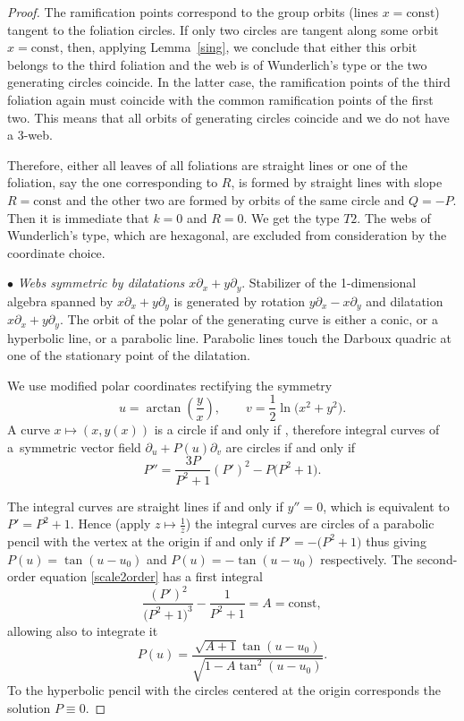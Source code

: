 \documentclass[pdftex]{sigma}
\numberwithin{equation}{section}
\begin{document}
\begin{proof}
The ramification points correspond to the group orbits (lines $x=\text{const}$) tangent to the foliation circles. If only two circles are tangent along some orbit $x=\text{const}$, then, applying Lemma~\ref{sing}, we conclude that either this orbit belongs to the third foliation and the web is of Wunderlich's type or the two generating circles coincide. In the latter case, the ramification points of the third foliation again must coincide with the common ramification points of the first two. This means that all orbits of generating circles coincide and we do not have a 3-web.

Therefore, either all leaves of all foliations are straight lines or one of the foliation, say the one corresponding to $R$, is formed by straight lines with slope $R=\text{const}$ and the other two are formed by orbits of the same circle and $Q=-P$. Then it is immediate that $k=0$ and $R=0$. We get the type $T2$. The webs of Wunderlich's type, which are hexagonal, are excluded from consideration by the coordinate choice.

$\bullet$ {\it Webs symmetric by dilatations $x\partial_x+y\partial_y$}.
Stabilizer of the 1-dimensional algebra spanned by $x\partial_x+y\partial_y$ is generated by rotation $y\partial_x-x\partial_y$ and dilatation $x\partial_x+y\partial_y$. The orbit of the polar of the generating curve is either a conic, or a hyperbolic line, or a parabolic line. Parabolic lines touch the Darboux quadric at one of the stationary point of the dilatation.

We use modified polar coordinates rectifying the symmetry
\begin{equation}\label{polar}
u = \arctan\left(\frac{y}{x}\right), \qquad v= \frac{1}{2} \ln\bigl(x^2 + y^2\bigr).
\end{equation}
A curve $x\mapsto (x,y(x))$ is a circle if and only if
,
therefore integral curves of a~symmetric vector field $\partial_u+P(u)\partial_v$ are circles
if and only if
\begin{equation}\label{scale2order}
P''=\frac{3P}{P^2 + 1}(P')^2 - P\bigl(P^2 + 1\bigr).
\end{equation}

The integral curves are straight lines if and only if $y''=0$, which is equivalent to
$P'=P^2+1$. Hence \big(apply $z\mapsto \frac{1}{z}$\big) the integral curves are circles of a parabolic pencil with the vertex at the origin if and only if $P'=-\big(P^2+1\big)$ thus giving $P(u)=\tan(u-u_0)$ and $P(u)=-\tan(u-u_0)$ respectively.
The second-order equation \eqref{scale2order} has a first integral
\[
\frac{(P')^2}{\bigl(P^2 + 1\bigr)^3} - \frac{1}{P^2 + 1} =A=\text{const},
\]
allowing also to integrate it
\[%
P(u)=\frac{\sqrt{A + 1}\tan(u - u_0)}{\sqrt{1 - A\tan^2(u - u_0)}}.
\]
To the hyperbolic pencil with the circles centered at the origin corresponds the solution $P\equiv 0$.



\end{proof}
\end{document}
